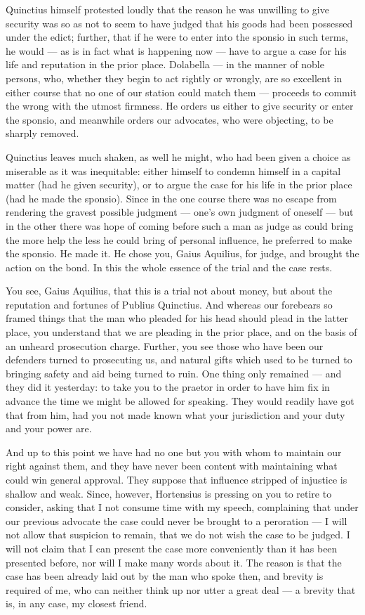  Quinctius himself protested loudly that the reason he was unwilling to give security was so as not to seem to have judged that his goods had been possessed under the edict; further, that if he were to enter into the sponsio in such terms, he would --- as is in fact what is happening now --- have to argue a case for his life and reputation in the prior place. Dolabella --- in the manner of noble persons, who, whether they begin to act rightly or wrongly, are so excellent in either course that no one of our station could match them --- proceeds to commit the wrong with the utmost firmness. He orders us either to give security or enter the sponsio, and meanwhile orders our advocates, who were objecting, to be sharply removed.

 Quinctius leaves much shaken, as well he might, who had been given a choice as miserable as it was inequitable: either himself to condemn himself in a capital matter (had he given security), or to argue the case for his life in the prior place (had he made the sponsio). Since in the one course there was no escape from rendering the gravest possible judgment --- one's own judgment of oneself --- but in the other there was hope of coming before such a man as judge as could bring the more help the less he could bring of personal influence, he preferred to make the sponsio. He made it. He chose you, Gaius Aquilius, for judge, and brought the action on the bond. In this the whole essence of the trial and the case rests.

 You see, Gaius Aquilius, that this is a trial not about money, but about the reputation and fortunes of Publius Quinctius. And whereas our forebears so framed things that the man who pleaded for his head should plead in the latter place, you understand that we are pleading in the prior place, and on the basis of an unheard prosecution charge. Further, you see those who have been our defenders turned to prosecuting us, and natural gifts which used to be turned to bringing safety and aid being turned to ruin. One thing only remained --- and they did it yesterday: to take you to the praetor in order to have him fix in advance the time we might be allowed for speaking. They would readily have got that from him, had you not made known what your jurisdiction and your duty and your power are.

 And up to this point we have had no one but you with whom to maintain our right against them, and they have never been content with maintaining what could win general approval. They suppose that influence stripped of injustice is shallow and weak. Since, however, Hortensius is pressing on you to retire to consider, asking that I not consume time with my speech, complaining that under our previous advocate the case could never be brought to a peroration --- I will not allow that suspicion to remain, that we do not wish the case to be judged. I will not claim that I can present the case more conveniently than it has been presented before, nor will I make many words about it. The reason is that the case has been already laid out by the man who spoke then, and brevity is required of me, who can neither think up nor utter a great deal --- a brevity that is, in any case, my closest friend.


